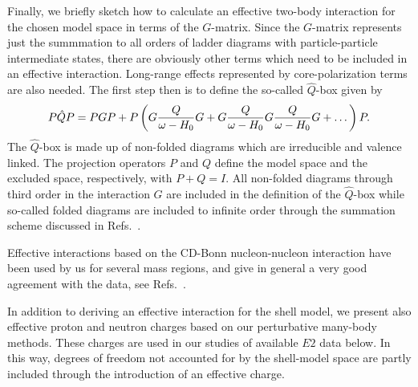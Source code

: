 Finally, we briefly sketch how to calculate an effective 
two-body interaction for the chosen model space
in terms of the $G$-matrix.  Since the $G$-matrix represents just
the summmation to all orders of ladder diagrams with particle-particle
intermediate states, there are obviously other terms which need to be included
in an effective interaction. Long-range effects represented by 
core-polarization terms are also needed.
The first step then is to define the so-called $\hat{Q}$-box given by
\begin{equation}
   P\hat{Q}P=PGP +
   P\left(G\frac{Q}{\omega-H_{0}}G\\ + G
   \frac{Q}{\omega-H_{0}}G \frac{Q}{\omega-H_{0}}G +\dots\right)P.
   \label{eq:qbox}
\end{equation}
The $\hat{Q}$-box is made up of non-folded diagrams which are irreducible
and valence linked. The projection operators $P$ and $Q$ define the model
space and the excluded space, respectively, with $P+Q=I$. 
All non-folded diagrams through 
third order in the interaction $G$ are included in the definition 
of the $\hat{Q}$-box while so-called 
folded diagrams are 
included to infinite order through the summation scheme discussed
in Refs.\ \cite{hko95,ko90}.

Effective interactions based on 
the CD-Bonn nucleon-nucleon interaction 
have been used by us for several mass regions, and give in general
a very good agreement with the data, see Refs.\ 
\cite{alex98,ehho98,ssh99,david99}.



In addition to deriving an effective interaction for the shell
model, we present also effective proton and neutron charges 
based on our perturbative many-body methods. These charges
are used in our studies of available $E2$ data below.
In this way, degrees
of freedom not accounted for by the shell-model space are partly
included through the introduction of an effective charge.

